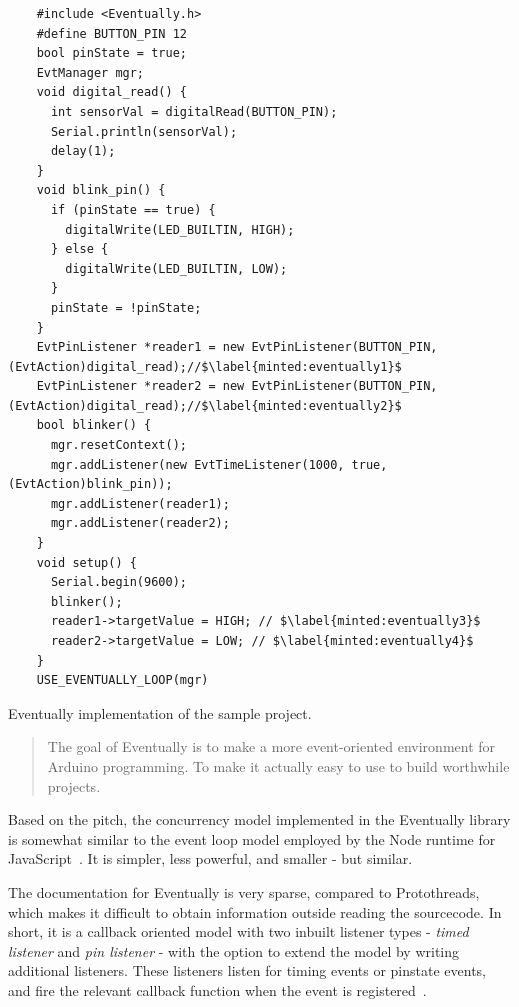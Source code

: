 \begin{listing}[htb!]
  \begin{verbatim}
    #include <Eventually.h>
    #define BUTTON_PIN 12
    bool pinState = true;
    EvtManager mgr;
    void digital_read() {
      int sensorVal = digitalRead(BUTTON_PIN);
      Serial.println(sensorVal);
      delay(1);
    }
    void blink_pin() {
      if (pinState == true) {
        digitalWrite(LED_BUILTIN, HIGH);
      } else {
        digitalWrite(LED_BUILTIN, LOW);
      }
      pinState = !pinState;
    }
    EvtPinListener *reader1 = new EvtPinListener(BUTTON_PIN, (EvtAction)digital_read);//$\label{minted:eventually1}$
    EvtPinListener *reader2 = new EvtPinListener(BUTTON_PIN, (EvtAction)digital_read);//$\label{minted:eventually2}$
    bool blinker() {
      mgr.resetContext();
      mgr.addListener(new EvtTimeListener(1000, true, (EvtAction)blink_pin));
      mgr.addListener(reader1);
      mgr.addListener(reader2);
    }
    void setup() {
      Serial.begin(9600);
      blinker();
      reader1->targetValue = HIGH; // $\label{minted:eventually3}$
      reader2->targetValue = LOW; // $\label{minted:eventually4}$
    }
    USE_EVENTUALLY_LOOP(mgr)
  \end{verbatim}
  \caption{Eventually implementation of the sample project.}
  \label{lst:eventuallyexample}
\end{listing}


\blockcquote{bartlettEventually2022Bartlett}{The goal of Eventually is to make a more event-oriented environment for Arduino programming. To make it actually easy to use to build worthwhile projects.}

Based on the pitch, the concurrency model implemented in the Eventually library is somewhat similar to the event loop model employed by the Node runtime for JavaScript~\cite{NodeJSdocs}. It is simpler, less powerful, and smaller - but similar.

The documentation for Eventually is very sparse, compared to Protothreads, which makes it difficult to obtain information outside reading the sourcecode. In short, it is a callback oriented model with two inbuilt listener types - \textit{timed listener} and \textit{pin listener} - with the option to extend the model by writing additional listeners. These listeners listen for timing events or pinstate events, and fire the relevant callback function when the event is registered~\cite{bartlettEventually2022Bartlett}.

